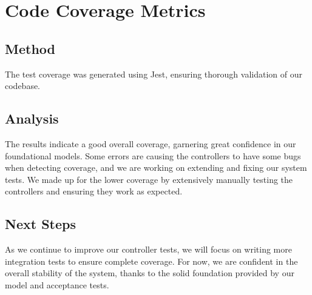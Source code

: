 \documentclass[12pt, titlepage]{article}
\begin{document}
\section{Code Coverage Metrics}

\subsection{Method}

The test coverage was generated using Jest, ensuring thorough validation of our codebase.

\subsection{Analysis}
The results indicate a good overall coverage, garnering great confidence in our foundational models.
Some errors are causing the controllers to have some bugs when detecting coverage, and we are working on extending and fixing our system tests. We made up for the lower coverage by extensively manually testing the controllers and ensuring they work as expected.

\subsection{Next Steps}
As we continue to improve our controller tests, we will focus on writing more integration tests to ensure complete coverage. For now, we are confident in the overall stability of the system, thanks to the solid foundation provided by our model and acceptance tests.
\end{document}
